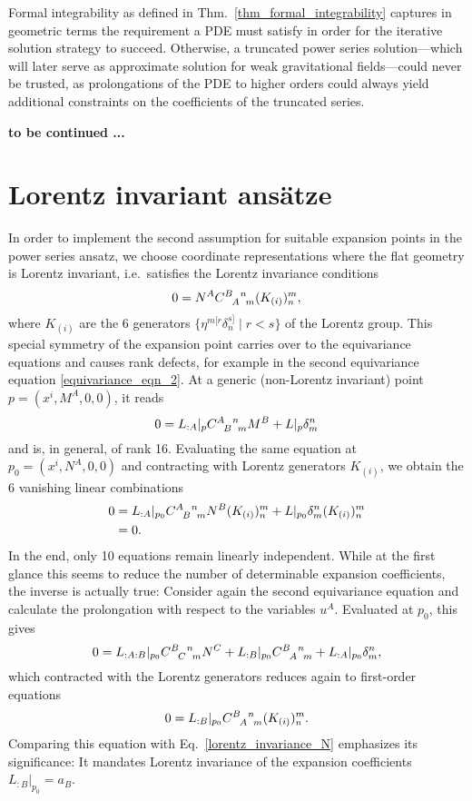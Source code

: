 Formal integrability as defined in Thm.~\ref{thm_formal_integrability} captures in geometric terms the requirement a PDE must satisfy in order for the iterative solution strategy to succeed. Otherwise, a truncated power series solution---which will later serve as approximate solution for weak gravitational fields---could never be trusted, as prolongations of the PDE to higher orders could always yield additional constraints on the coefficients of the truncated series.

\textbf{to be continued ...}

\section{Lorentz invariant ansätze}

In order to implement the second assumption for suitable expansion points in the power series ansatz, we choose coordinate representations where the flat geometry is Lorentz invariant, i.e.~satisfies the Lorentz invariance conditions
\begin{equation}\label{lorentz_invariance_N}
  0 = N^A \gmc{B}{A}{n}{m} (K_{(i)})^m_n,
\end{equation}
where $K_{(i)}$ are the 6 generators $\{ \eta^{m\lbrack r}\delta^{s\rbrack}_n \mid r < s \}$ of the Lorentz group. This special symmetry of the expansion point carries over to the equivariance equations and causes rank defects, for example in the second equivariance equation \eqref{equivariance_eqn_2}. At a generic (non-Lorentz invariant) point $p=(x^i,M^A,0,0)$, it reads
\begin{equation}
  0 = L_{:A}\rvert_p \gmc{A}{B}{n}{m} M^B + L\rvert_p \delta^n_m
\end{equation}
and is, in general, of rank 16. Evaluating the same equation at $p_0 = (x^i,N^A,0,0)$ and contracting with Lorentz generators $K_{(i)}$, we obtain the 6 vanishing linear combinations
\begin{equation}
  \begin{aligned}
    0 &{} = L_{:A}\rvert_{p_0} \gmc{A}{B}{n}{m} N^B (K_{(i)})^m_n + L\rvert_{p_0} \delta^n_m (K_{(i)})^m_n \\
      &{} = 0.
  \end{aligned}
\end{equation}
In the end, only 10 equations remain linearly independent. While at the first glance this seems to reduce the number of determinable expansion coefficients, the inverse is actually true: Consider again the second equivariance equation and calculate the prolongation with respect to the variables $u^A$. Evaluated at $p_0$, this gives
\begin{equation}
  0 = L_{:A:B}\rvert_{p_0} \gmc{B}{C}{n}{m} N^C + L_{:B}\rvert_{p_0} \gmc{B}{A}{n}{m} + L_{:A}\rvert_{p_0} \delta^n_m,
\end{equation}
which contracted with the Lorentz generators reduces again to first-order equations
\begin{equation}
  0 = L_{:B}\rvert_{p_0}\gmc{B}{A}{n}{m}(K_{(i)})^m_n.
\end{equation}
Comparing this equation with Eq.~\ref{lorentz_invariance_N} emphasizes its significance: It mandates Lorentz invariance of the expansion coefficients $L_{:B}\rvert_{p_0} = a_B$.

